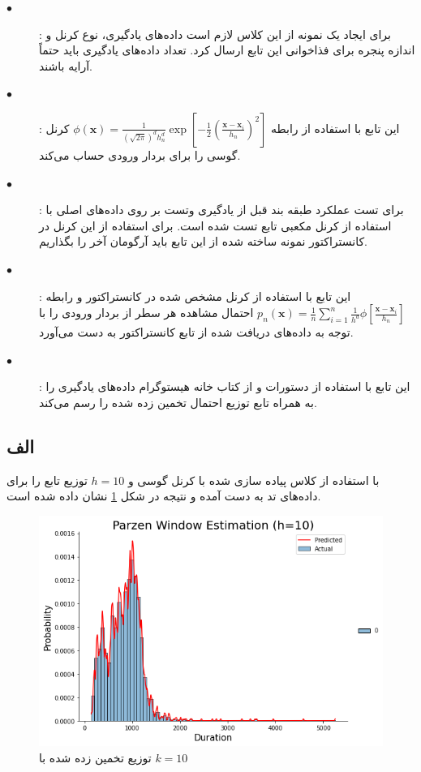 \documentclass[12pt,onecolumn,a4paper]{article}
\begin{document}
\begin{description}
    \item[$\bullet$] : برای ایجاد یک نمونه از این کلاس لازم است داده‌های یادگیری، نوع کرنل و اندازه پنجره برای فذاخوانی این تابع ارسال کرد. تعداد داده‌های یادگیری باید حتماً آرایه  باشند.
    \item[$\bullet$] : این تابع با استفاده از رابطه $ \phi(\boldsymbol{x}) = \frac{1}{(\sqrt{2 \pi})^{d} h_{n}^{d}} \exp \left[-\frac{1}{2}\left(\frac{\boldsymbol{x}-\boldsymbol{x}_{i}}{h_{n}}\right)^{2}\right]$ کرنل گوسی را برای بردار ورودی حساب می‌کند. 
    \item[$\bullet$] : برای تست عملکرد طبقه بند قبل از یادگیری وتست بر روی داده‌های اصلی با استفاده از کرنل مکعبی تابع  تست شده است. برای استفاده از این کرنل در کانستراکتور نمونه ساخته شده از این تابع باید آرگومان آخر را  بگذاریم.
    \item[$\bullet$] : این تابع با استفاده از کرنل مشخص شده در کانستراکتور و رابطه $p_{n}(\boldsymbol{x})=\frac{1}{n} \sum_{i=1}^{n} \frac{1}{h^{d}} \phi\left[\frac{\boldsymbol{x}-\boldsymbol{x}_{i}}{h_{n}}\right]$ احتمال مشاهده هر سطر از بردار ورودی را با توجه به داده‌های دریافت شده از تابع کانستراکتور به دست می‌آورد.
    \item[$\bullet$] : این تابع با استفاده از دستورات  و  از کتاب خانه  هیستوگرام داده‌های یادگیری را به همراه تابع توزیع احتمال تخمین زده شده را رسم می‌کند.
\end{description}

\subsection*{الف}
با استفاده از کلاس پیاده سازی شده با کرنل گوسی و $h=10$ توزیع تابع را برای داده‌های تد به  دست آمده و نتیجه در شکل \ref{fig:5} نشان داده شده است.
\begin{figure}[h!]
    \begin{center}
    \includegraphics[scale=0.5]{q8/Q8_a.png}
    \caption{توزیع تخمین زده شده با $k = 10$}
    \label{fig:5}
    \end{center}
\end{figure}
\end{document}
